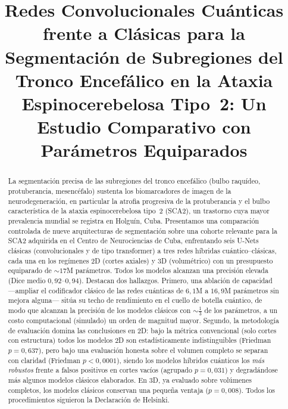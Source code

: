 \documentclass[runningheads]{llncs}
\title{Redes Convolucionales Cuánticas frente a Clásicas para la\\
Segmentación de Subregiones del Tronco Encefálico en la Ataxia\\
Espinocerebelosa Tipo~2: Un Estudio Comparativo con Parámetros Equiparados}
\author{\todo{Autor Uno}\inst{1} \and
\todo{Autor Dos}\inst{1} \and
\todo{Autor Senior}\inst{1}}
\institute{Centro de Neurociencias de Cuba (CNEURO), La Habana, Cuba\\
\email{\todo{correspondencia@email}}}
\begin{document}
\maketitle

\begin{abstract}
La segmentación precisa de las subregiones del tronco encefálico (bulbo
raquídeo, protuberancia, mesencéfalo) sustenta los biomarcadores de imagen de
la neurodegeneración, en particular la atrofia progresiva de la protuberancia y
el bulbo característica de la ataxia espinocerebelosa tipo~2 (SCA2), un
trastorno cuya mayor prevalencia mundial se registra en Holguín, Cuba.
Presentamos una comparación controlada de nueve arquitecturas de segmentación
sobre una cohorte relevante para la SCA2 adquirida en el Centro de
Neurociencias de Cuba, enfrentando seis U-Nets clásicas (convolucionales y de
tipo transformer) a tres redes híbridas cuántico--clásicas, cada una en los
regímenes 2D (cortes axiales) y 3D (volumétrico) con un presupuesto equiparado
de ${\sim}17$M parámetros. Todos los modelos alcanzan una precisión elevada
(Dice medio $0{,}92$--$0{,}94$). Destacan dos hallazgos. Primero, una ablación
de capacidad ---ampliar el codificador clásico de las redes cuánticas de
$6{,}1$M a $16{,}9$M parámetros sin mejora alguna--- sitúa su techo de
rendimiento en el cuello de botella cuántico, de modo que alcanzan la precisión
de los modelos clásicos con ${\sim}\tfrac{1}{3}$ de los parámetros, a un costo
computacional (simulado) un orden de magnitud mayor. Segundo, la metodología de
evaluación domina las conclusiones en 2D: bajo la métrica convencional
(solo cortes con estructura) todos los modelos 2D son estadísticamente
indistinguibles (Friedman $p{=}0{,}637$), pero bajo una evaluación honesta sobre
el volumen completo se separan con claridad (Friedman $p{<}0{,}0001$), siendo
los modelos híbridos cuánticos los \emph{más robustos} frente a falsos
positivos en cortes vacíos (agrupado $p{=}0{,}031$) y degradándose más algunos
modelos clásicos elaborados. En 3D, ya evaluado sobre volúmenes completos, los
modelos clásicos conservan una pequeña ventaja ($p{=}0{,}008$). Todos los
procedimientos siguieron la Declaración de Helsinki.
\end{abstract}

\end{document}
